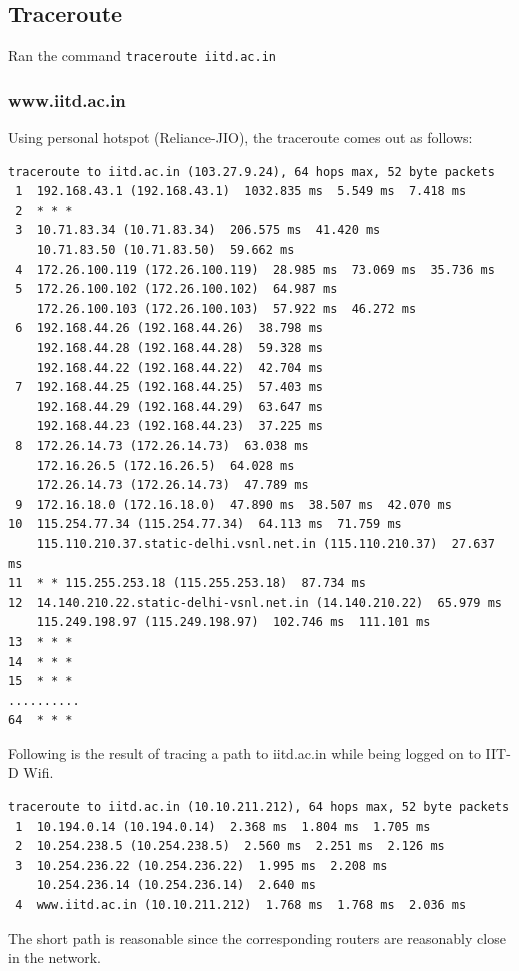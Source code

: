 \documentclass[a4paper]{article}
\begin{document}
\subsection{Traceroute}
Ran the command \texttt{traceroute iitd.ac.in}
\subsubsection{www.iitd.ac.in}
Using personal hotspot (Reliance-JIO), the traceroute comes out as follows:
\begin{lstlisting}
traceroute to iitd.ac.in (103.27.9.24), 64 hops max, 52 byte packets
 1  192.168.43.1 (192.168.43.1)  1032.835 ms  5.549 ms  7.418 ms
 2  * * *
 3  10.71.83.34 (10.71.83.34)  206.575 ms  41.420 ms
    10.71.83.50 (10.71.83.50)  59.662 ms
 4  172.26.100.119 (172.26.100.119)  28.985 ms  73.069 ms  35.736 ms
 5  172.26.100.102 (172.26.100.102)  64.987 ms
    172.26.100.103 (172.26.100.103)  57.922 ms  46.272 ms
 6  192.168.44.26 (192.168.44.26)  38.798 ms
    192.168.44.28 (192.168.44.28)  59.328 ms
    192.168.44.22 (192.168.44.22)  42.704 ms
 7  192.168.44.25 (192.168.44.25)  57.403 ms
    192.168.44.29 (192.168.44.29)  63.647 ms
    192.168.44.23 (192.168.44.23)  37.225 ms
 8  172.26.14.73 (172.26.14.73)  63.038 ms
    172.16.26.5 (172.16.26.5)  64.028 ms
    172.26.14.73 (172.26.14.73)  47.789 ms
 9  172.16.18.0 (172.16.18.0)  47.890 ms  38.507 ms  42.070 ms
10  115.254.77.34 (115.254.77.34)  64.113 ms  71.759 ms
    115.110.210.37.static-delhi.vsnl.net.in (115.110.210.37)  27.637 ms
11  * * 115.255.253.18 (115.255.253.18)  87.734 ms
12  14.140.210.22.static-delhi-vsnl.net.in (14.140.210.22)  65.979 ms
    115.249.198.97 (115.249.198.97)  102.746 ms  111.101 ms
13  * * *
14  * * *
15  * * *
..........
64  * * * 
\end{lstlisting}
Following is the result of tracing a path to iitd.ac.in while being logged on to IIT-D Wifi.
\begin{lstlisting}
traceroute to iitd.ac.in (10.10.211.212), 64 hops max, 52 byte packets
 1  10.194.0.14 (10.194.0.14)  2.368 ms  1.804 ms  1.705 ms
 2  10.254.238.5 (10.254.238.5)  2.560 ms  2.251 ms  2.126 ms
 3  10.254.236.22 (10.254.236.22)  1.995 ms  2.208 ms
    10.254.236.14 (10.254.236.14)  2.640 ms
 4  www.iitd.ac.in (10.10.211.212)  1.768 ms  1.768 ms  2.036 ms
\end{lstlisting}
The short path is reasonable since the corresponding routers are reasonably close in the network. \\
\end{document}
